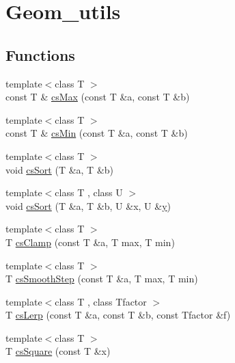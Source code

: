 \hypertarget{group__geom__utils}{}\section{Geom\+\_\+utils}
\label{group__geom__utils}
\subsection*{Functions}
\begin{DoxyCompactItemize}
\item 
{\footnotesize template$<$class T $>$ }\\const T \& \hyperlink{group__geom__utils_gad847ae4a7674e661f256da05955e7eb7}{cs\+Max} (const T \&a, const T \&b)
\item 
{\footnotesize template$<$class T $>$ }\\const T \& \hyperlink{group__geom__utils_ga84074616ede088bc78fe3566f87eab81}{cs\+Min} (const T \&a, const T \&b)
\item 
{\footnotesize template$<$class T $>$ }\\void \hyperlink{group__geom__utils_gae988b1834e0316df2aab598e45ea4639}{cs\+Sort} (T \&a, T \&b)
\item 
{\footnotesize template$<$class T , class U $>$ }\\void \hyperlink{group__geom__utils_gac15f60e919826a14d41be755b9a73cad}{cs\+Sort} (T \&a, T \&b, U \&x, U \&\hyperlink{IceUtils_8h_aa7ffaed69623192258fb8679569ff9ba}{y})
\item 
{\footnotesize template$<$class T $>$ }\\T \hyperlink{group__geom__utils_gaa317019148dc6f7659a3a6ab244a39ba}{cs\+Clamp} (const T \&a, T max, T min)
\item 
{\footnotesize template$<$class T $>$ }\\T \hyperlink{group__geom__utils_ga4ae5527a870c7f63d552657905c9939a}{cs\+Smooth\+Step} (const T \&a, T max, T min)
\item 
{\footnotesize template$<$class T , class Tfactor $>$ }\\T \hyperlink{group__geom__utils_gad5238b838897dc5350774d44e5f52001}{cs\+Lerp} (const T \&a, const T \&b, const Tfactor \&f)
\item 
{\footnotesize template$<$class T $>$ }\\T \hyperlink{group__geom__utils_ga490abe249d6289528341e55af14b5e14}{cs\+Square} (const T \&x)
\end{DoxyCompactItemize}
